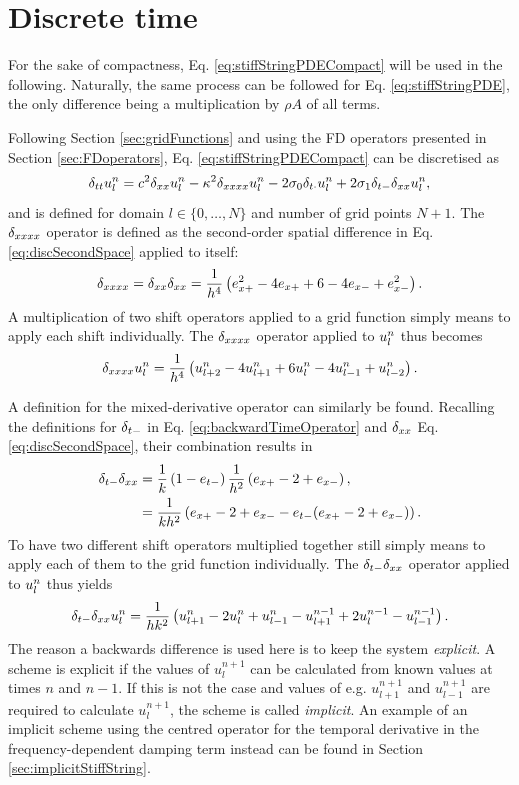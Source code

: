 \section{Discrete time}\label{sec:stiffStringDiscrete}
For the sake of compactness, Eq. \eqref{eq:stiffStringPDECompact} will be used in the following. Naturally, the same process can be followed for Eq. \eqref{eq:stiffStringPDE}, the only difference being a multiplication by $\rho A$ of all terms.

Following Section \ref{sec:gridFunctions} and using the FD operators presented in Section \ref{sec:FDoperators}, Eq. \eqref{eq:stiffStringPDECompact} can be discretised as 
\begin{equation}\label{eq:stiffStringFDS}
    \delta_{tt} u_l^n = c^2 \delta_{xx} u_l^n - \kappa^2 \delta_{xxxx} u_l^n - 2 \sigma_{0} \delta_{t\cdot} u_l^n + 2 \sigma_{1}\delta_{t-}\delta_{xx} u_l^n,
\end{equation}
and is defined for domain $l\in\{0, \hdots, N\}$ and number of grid points $N+1$. 
The $\delta_{xxxx}$ operator is defined as the second-order spatial difference in Eq. \eqref{eq:discSecondSpace} applied to itself:
\begin{equation}\label{eq:dxxxx}
    \delta_{xxxx} = \delta_{xx}\delta_{xx} = \frac{1}{h^4}\left(e_{x+}^2 - 4e_{x+}+6 - 4e_{x-}+e_{x-}^2\right).
\end{equation} 
A multiplication of two shift operators applied to a grid function simply means to apply each shift individually. The $\delta_{xxxx}$ operator applied to $u_l^n$ thus becomes
\begin{equation}
    \delta_{xxxx}u_l^n = \frac{1}{h^4}\left(u_{l+2}^n - 4u_{l+1}^n+6u_l^n - 4u_{l-1}^n+u_{l-2}^n\right).
\end{equation}

A definition for the mixed-derivative operator can similarly be found.
Recalling the definitions for $\delta_{t-}$ in Eq. \eqref{eq:backwardTimeOperator} and $\delta_{xx}$ Eq. \eqref{eq:discSecondSpace}, their combination results in
\begin{align}
    \delta_{t-}\delta_{xx} &= \frac{1}{k}\left(1-e_{t-}\right)\frac{1}{h^2}\left(e_{x+}-2+e_{x-}\right),\nonumber \\
    &= \frac{1}{kh^2}\left(e_{x+}-2+e_{x-} - e_{t-}(e_{x+}-2+e_{x-})\right).
\end{align}
To have two different shift operators multiplied together still simply means to apply each of them to the grid function individually. The $\delta_{t-}\delta_{xx}$ operator applied to $u_l^n$ thus yields
\begin{equation}
    \delta_{t-} \delta_{xx} u_l^n = \frac{1}{hk^2}\left(u_{l+1}^n - 2 u_l^n + u_{l-1}^n - u_{l+1}^{n-1} + 2 u_l^{n-1} - u_{l-1}^{n-1}\right).
\end{equation}
The reason a backwards difference is used here is to keep the system \textit{explicit}. A scheme is explicit if the values of $u_l^{n+1}$ can be calculated from known values at times $n$ and $n-1$. If this is not the case and values of e.g. $u_{l+1}^{n+1}$ and $u_{l-1}^{n+1}$ are required to calculate $u_l^{n+1}$, the scheme is called \textit{implicit}. An example of an implicit scheme using the centred operator for the temporal derivative in the frequency-dependent damping term instead can be found in Section \ref{sec:implicitStiffString}.

